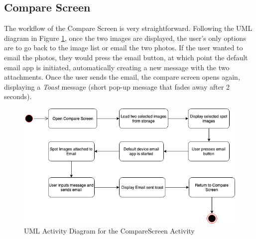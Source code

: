 \subsection{Compare Screen}
The workflow of the Compare Screen is very straightforward. Following the UML diagram in Figure \ref{fig:CompareScreen}, once the two images are displayed, the user's only options are to go back to the image list or email the two photos. If the user wanted to email the photos, they would press the email button, at which point the default email app is initiated, automatically creating a new message with the two attachments. Once the user sends the email, the compare screen opens again, displaying a \emph{Toast} message (short pop-up message that fades away after 2 seconds).

\begin{figure}
    \includegraphics[width=1.2\textwidth, center]{figures/CompareScreen.png}
    \caption{UML Activity Diagram for the CompareScreen Activity}
    \label{fig:CompareScreen}
\end{figure}

